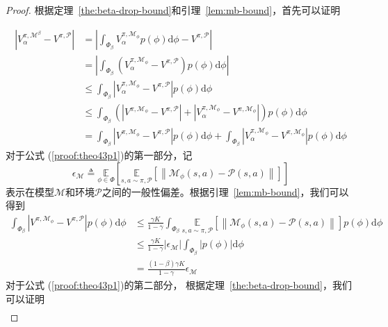 \begin{proof}

根据定理~\ref{the:beta-drop-bound}和引理~\ref{lem:mb-bound}，首先可以证明

\begin{align}
\left|{V}_\alpha^{\pi, \mathcal{M}^\beta}-{V}^{\pi, \mathcal{P}}\right|&=\left|\int_{\Phi_\beta}{V}_\alpha^{\pi, \mathcal{M}_{\phi}}p(\phi)\mathrm{d}\phi-{V}^{\pi, \mathcal{P}}\right| \\
&=\left|\int_{\Phi_\beta}\left({V}_\alpha^{\pi, \mathcal{M}_{\phi}}-{V}^{\pi, \mathcal{P}}\right)p(\phi)\mathrm{d}\phi\right| \\
&\leq\int_{\Phi_\beta}\left|{V}_\alpha^{\pi, \mathcal{M}_{\phi}}-{V}^{\pi, \mathcal{P}}\right|p(\phi)\mathrm{d}\phi\\
&\leq\int_{\Phi_\beta}\left(\left|{V}^{\pi, \mathcal{M}_{\phi}}-{V}^{\pi, \mathcal{P}}\right|+\left|{V}_\alpha^{\pi, \mathcal{M}_{\phi}} - {V}^{\pi,\mathcal{M}_{\phi}}\right|\right)p(\phi)\mathrm{d}\phi\\
&= \int_{\Phi_\beta}\left|{V}^{\pi, \mathcal{M}_{\phi}}-{V}^{\pi, \mathcal{P}}\right|p(\phi)\mathrm{d}\phi+\int_{\Phi_\beta}\left|{V}_\alpha^{\pi, \mathcal{M}_{\phi}} - {V}^{\pi,\mathcal{M}_{\phi}}\right|p(\phi)\mathrm{d}\phi \label{proof:theo43p1}
\end{align}
对于公式 (\ref{proof:theo43p1})的第一部分，记
\begin{equation}
    \epsilon_{\mathcal{M}}\triangleq\underset{\phi\in\Phi}{\mathbb{E}}\left[\underset{s,a\sim \pi,\mathcal{P}}{\mathbb{E}}\left[\left\|\mathcal{M}_\phi(s, a)-\mathcal{P}(s, a)\right\|\right]\right]
\end{equation}
表示在模型$\mathcal{M}$和环境$\mathcal{P}$之间的一般性偏差。根据引理~\ref{lem:mb-bound}，我们可以得到
\begin{align}
\int_{\Phi_\beta}\left|{V}^{\pi, \mathcal{M}_{\phi}}-{V}^{\pi, \mathcal{P}}\right|p(\phi)\mathrm{d}\phi &\leq \frac{\gamma K}{1-\gamma}\int_{\Phi_\beta}\underset{s,a\sim\pi,\mathcal{P}}{\mathbb{E}}\left[\left\|\mathcal{M}_\phi(s, a)-\mathcal{P}(s, a)\right\|\right]p(\phi)\mathrm{d}\phi\\
&\leq \frac{\gamma K}{1-\gamma}\left|\epsilon_{\mathcal{M}}\right|\int_{\Phi_\beta}\left|p(\phi)\right|\mathrm{d}\phi\\
&=\frac{(1-\beta)\gamma K}{1-\gamma}\epsilon_{\mathcal{M}} \label{proof:theo43p2}
\end{align}
对于公式 (\ref{proof:theo43p1})的第二部分， 根据定理~\ref{the:beta-drop-bound}，我们可以证明
\begin{align}

\end{align}
\end{proof}
